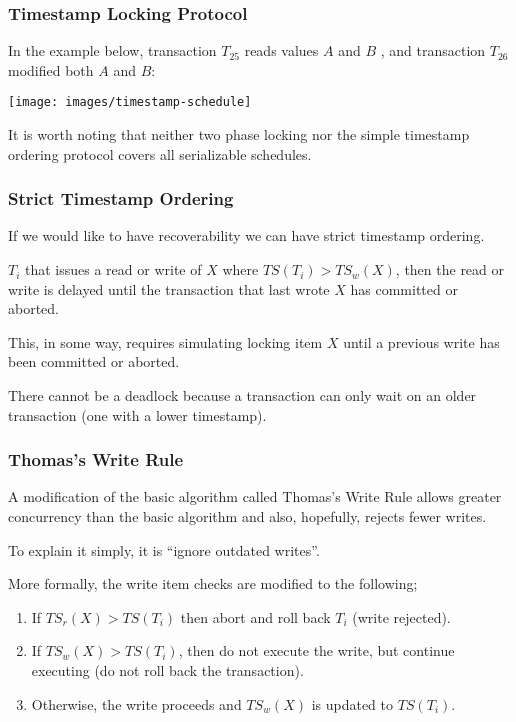 \begin{frame}
\frametitle{Timestamp Locking Protocol}

In the example below, transaction $T_{25}$ reads values $A$ and $B$ , and transaction $T_{26}$ modified both $A$ and $B$:

\begin{center}
	\texttt{[image: images/timestamp-schedule]}
\end{center}

It is worth noting that neither two phase locking nor the simple timestamp ordering protocol covers all serializable schedules.


\end{frame}

\begin{frame}
\frametitle{Strict Timestamp Ordering}
If we would like to have recoverability we can have strict timestamp ordering.

$T_{i}$ that issues a read or write of $X$ where $T\!S(T_{i}) > T\!S_{w}(X)$, then the read or write is delayed until the transaction that last wrote $X$ has committed or aborted. 

This, in some way, requires simulating locking item $X$ until a previous write has been committed or aborted.

There cannot be a deadlock because a transaction can only wait on an older transaction (one with a lower timestamp).

\end{frame}

\begin{frame}
\frametitle{Thomas's Write Rule}
A modification of the basic algorithm called Thomas's Write Rule allows greater concurrency than the basic algorithm and also, hopefully, rejects fewer writes. 

To explain it simply, it is ``ignore outdated writes''.

More formally, the write item checks are modified to the following;
\begin{enumerate}
	\item If $T\!S_{r}(X) > T\!S(T_{i})$ then abort and roll back $T_{i}$ (write rejected).
	\item If $T\!S_{w}(X) > T\!S(T_{i})$, then do not execute the write, but continue executing (do not roll back the transaction).
	\item Otherwise, the write proceeds and $T\!S_{w}(X)$ is updated to $T\!S(T_{i})$. 
\end{enumerate}

\end{frame}

